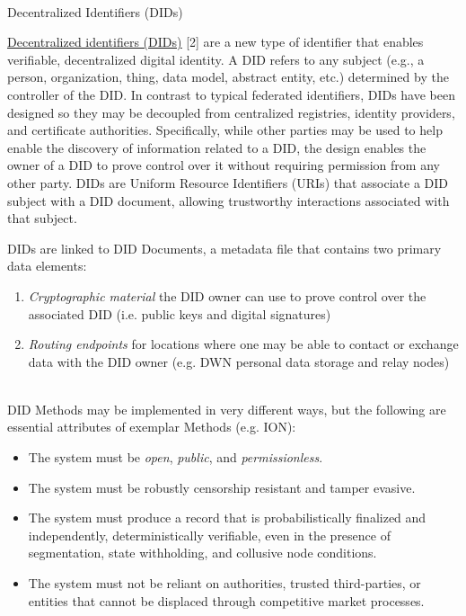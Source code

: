 \documentclass[11pt]{article}
\begin{document}
{\LARGE  \\ Decentralized Identifiers (DIDs)}

\vspace{1\baselineskip}
\href{https://www.w3.org/TR/did-core}{\uline{\textcolor[HTML]{1155CC}{Decentralized identifiers (DIDs)}}} [2] are a new type of identifier that enables verifiable, decentralized digital identity. A DID refers to any subject (e.g., a person, organization, thing, data model, abstract entity, etc.) determined by the controller of the DID. In contrast to typical federated identifiers, DIDs have been designed so they may be decoupled from centralized registries, identity providers, and certificate authorities. Specifically, while other parties may be used to help enable the discovery of information related to a DID, the design enables the owner of a DID to prove control over it without requiring permission from any other party. DIDs are Uniform Resource Identifiers (URIs) that associate a DID subject with a DID document, allowing trustworthy interactions associated with that subject.

\vspace{1\baselineskip}
DIDs are linked to DID Documents, a metadata file that contains two primary data elements: \\ 

\begin{enumerate}
	\item \textit{Cryptographic material} the DID owner can use to prove control over the associated DID (i.e. public keys and digital signatures) 

	\item \textit{Routing endpoints} for locations where one may be able to contact or exchange data with the DID owner (e.g. DWN personal data storage and relay nodes)

\end{enumerate}
 \\ DID Methods may be implemented in very different ways, but the following are essential attributes of exemplar Methods (e.g. ION): \\ 

\begin{itemize}
	\item The system must be \textit{open}, \textit{public}, and \textit{permissionless}.

	\item The system must be robustly censorship resistant and tamper evasive.

	\item The system must produce a record that is probabilistically finalized and independently, deterministically verifiable, even in the presence of segmentation, state withholding, and collusive node conditions.

	\item The system must not be reliant on authorities, trusted third-parties, or entities that cannot be displaced through competitive market processes.

\vspace{1\baselineskip}
\end{itemize}
\end{document}
